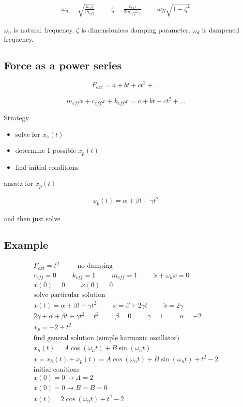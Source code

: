 \documentclass[fleqn]{report}
\newcommand{\hp}{\hspace{1cm}}
\newcommand{\equations} [1] {
\begin{gather*}
#1
\end{gather*}
}
\begin{document}
\equations{
    \omega_n = \sqrt{\frac{k_{eff}}{m_{eff}}}
    \hp 
    \zeta = \frac{c_{eff}}{2 m_{eff} \omega_n}
    \hp 
    \omega_N \sqrt{1 - \zeta^2}
}
$\omega_n$ is natural frequency. $\zeta$ is dimensionless damping parameter. $\omega_d$ is dampened frequency. 

\subsection{Force as a power series}
\[
F_{ext} = a + bt + ct^2 + \ldots
\]
\equations{
    m_{eff} \ddot x + c_{eff} \dot x + k_{eff} x 
    =
    a + bt + ct^2 + \ldots
}
Strategy 
\begin{itemize}
    \item
    solve for $x_h(t)$
    \item 
    determine 1 possible $x_p(t)$
    \item 
    find initial conditions 
\end{itemize}

ansatz for $x_p(t)$
\equations{
    x_p(t) = \alpha + \beta t + \gamma t^2
}
and then just solve 

\subsection{Example}
\equations{
    F_{ext} = t^2 \hp \textrm{ no damping}
    \\
    c_{eff} = 0 \hp k_{eff} = 1 \hp m_{eff} = 1
    \hp 
    \ddot x + \omega_n x = 0
    \\
    x(0) = 0 \hp \dot x(0) = 0
    \\
    \textrm{solve particular solution}
    \\
    x(t) = \alpha + \beta t + \gamma t^2 
    \hp 
    \dot x = \beta + 2 \gamma t 
    \hp 
    \ddot x = 2 \gamma 
    \\
    2 \gamma + \alpha + \beta t + \gamma t^2 = t^2
    \hp 
    \beta = 0 \hp \gamma = 1 \hp \alpha = -2 
    \\
    x_p = -2 + t^2
    \\
    \textrm{find general solution (simple harmonic oscillator)}
    \\
    x_h(t) = A \cos(\omega_n t) + B\sin(\omega_n t)
    \\
    x = x_h(t) + x_p(t) = A \cos(\omega_n t) + B \sin(\omega_n t) + t^2 - 2
    \\
    \textrm{initial conitions}
    \\
    x(0) = 0 \rightarrow A = 2
    \\
    \dot x(0) = 0 \rightarrow B = B = 0
    \\
    x(t) = 2 \cos(\omega_n t) + t^2 - 2
}
\end{document}
